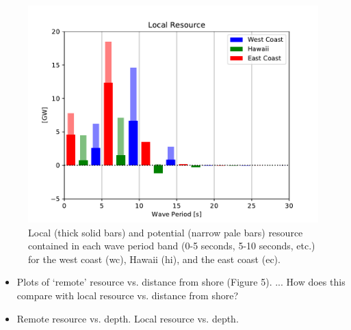 \begin{figure}[ht]
  \centering
  \includegraphics[width=\linewidth]{../fig/LocalResource_Freq01.pdf}
  \caption{Local (thick solid bars) and potential (narrow pale bars) resource contained in each wave period band (0-5 seconds, 5-10 seconds, etc.) for the west coast (wc), Hawaii (hi), and the east coast (ec).}
  \label{fig:remote-freq}
\end{figure}

\begin{itemize}
\item Plots of ‘remote’ resource vs. distance from shore (Figure 5). ... How does this compare with local resource vs. distance from shore?
\item Remote resource vs. depth. Local resource vs. depth.
\end{itemize}


